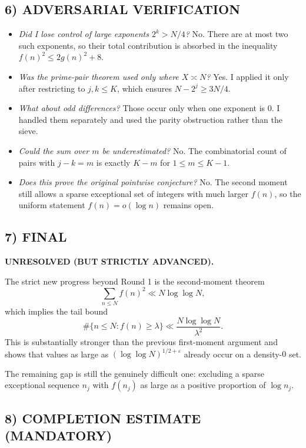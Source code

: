 \subsection*{6) ADVERSARIAL VERIFICATION}

\begin{itemize}
\item \emph{Did I lose control of large exponents $2^k>N/4$?} No. There are at most two such exponents, so their total contribution is absorbed in the inequality $f(n)^2\le 2g(n)^2+8$.

\item \emph{Was the prime-pair theorem used only where $X\asymp N$?} Yes. I applied it only after restricting to $j,k\le K$, which ensures $N-2^j\ge 3N/4$.

\item \emph{What about odd differences?} Those occur only when one exponent is $0$. I handled them separately and used the parity obstruction rather than the sieve.

\item \emph{Could the sum over $m$ be underestimated?} No. The combinatorial count of pairs with $j-k=m$ is exactly $K-m$ for $1\le m\le K-1$.

\item \emph{Does this prove the original pointwise conjecture?} No. The second moment still allows a sparse exceptional set of integers with much larger $f(n)$, so the uniform statement $f(n)=o(\log n)$ remains open.
\end{itemize}

\subsection*{7) FINAL}

\textbf{UNRESOLVED (BUT STRICTLY ADVANCED).}

The strict new progress beyond Round 1 is the second-moment theorem
\[
\sum_{n\le N} f(n)^2 \ll N\log\log N,
\]
which implies the tail bound
\[
\#\{n\le N:f(n)\ge \lambda\}\ll \frac{N\log\log N}{\lambda^2}.
\]
This is substantially stronger than the previous first-moment argument and shows that values as large as $(\log\log N)^{1/2+\varepsilon}$ already occur on a density-$0$ set.

The remaining gap is still the genuinely difficult one: excluding a sparse exceptional sequence $n_j$ with $f(n_j)$ as large as a positive proportion of $\log n_j$.

\subsection*{8) COMPLETION ESTIMATE (MANDATORY)}

